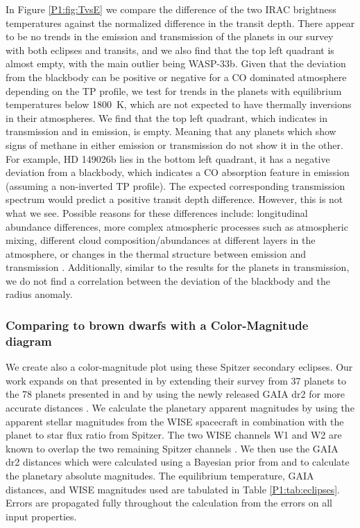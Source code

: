 In Figure \ref{P1:fig:TvsE} we compare the difference of the two IRAC brightness temperatures against the normalized difference in the transit depth. There appear to be no trends in the emission and transmission of the planets in our survey with both eclipses and transits, and we also find that the top left quadrant is almost empty, with the main outlier being WASP-33b. Given that the deviation from the blackbody can be positive or negative for a CO dominated atmosphere depending on the TP profile, we test for trends in the planets with equilibrium temperatures below 1800~K, which are not expected to have thermally inversions in their atmospheres. We find that the top left quadrant, which indicates  in transmission and  in emission, is empty. Meaning that any planets which show signs of methane in either emission or transmission do not show it in the other. For example, HD 149026b lies in the bottom left quadrant, it has a negative deviation from a blackbody, which indicates a CO absorption feature in emission (assuming a non-inverted TP profile). The expected corresponding transmission spectrum would predict a positive transit depth difference. However, this is not what we see. Possible reasons for these differences include: longitudinal abundance differences, more complex atmospheric processes such as atmospheric mixing, different cloud composition/abundances at different layers in the atmosphere, or changes in the thermal structure between emission and transmission \citep[e.g.,][]{Fortney2005}. Additionally, similar to the results for the planets in transmission, we do not find a correlation between the deviation of the blackbody and the radius anomaly.


\subsubsection{Comparing to brown dwarfs with a Color-Magnitude diagram}


We create also a color-magnitude plot using these Spitzer secondary eclipses. Our work expands on that presented in \citet{Triaud2014c} by extending their survey from 37 planets to the 78 planets presented in \citet{Baxter2020} and by using the newly released GAIA dr2 for more accurate distances \citep{GaiaCollaborationandBrown2018}. We calculate the planetary apparent magnitudes by using the apparent stellar magnitudes from the WISE spacecraft \citep{Cutri2012} in combination with the planet to star flux ratio from Spitzer. The two WISE channels W1 and W2 are known to overlap the two remaining Spitzer channels \citep{Kirkpatrick2011}. We then use the GAIA dr2 distances which were calculated using a Bayesian prior from \citet{GaiaCollaborationandBrown2018} and \citet{Bailer-Jones2018} to calculate the planetary absolute magnitudes. The equilibrium temperature, GAIA distances, and WISE magnitudes used are tabulated in Table \ref{P1:tab:eclipses}. Errors are propagated fully throughout the calculation from the errors on all input properties.

